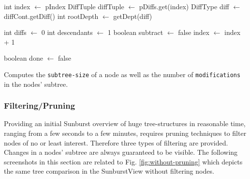 \begin{algorithm}[tb]
{}
\BlankLine
int index $\leftarrow$ pIndex\;
DiffTuple diffTuple $\leftarrow$ pDiffs.get(index)\;
DiffType diff $\leftarrow$ diffCont.getDiff()\;
int rootDepth $\leftarrow$ getDept(diff)\;

int diffs $\leftarrow$ 0\;
int descendants $\leftarrow$ 1\;
boolean subtract $\leftarrow$ false\;
index $\leftarrow$ index + 1\;


boolean done $\leftarrow$ false\;
\caption{Computes the \texttt{subtree-size} of a node as well as the number of \texttt{modifications} in the nodes' subtree.}\label{algo:descModCount}
\end{algorithm}

\subsubsection{Filtering/Pruning}
Providing an initial Sunburst overview of huge tree-struc\-tures in reasonable time, ranging from a few seconds to a few minutes, requires pruning techniques to filter nodes of no or least interest. Therefore three types of filtering are provided. Changes in a nodes' subtree are always guaranteed to be visible. The following screenshots in this section are related to Fig. \ref{fig:without-pruning} which depicts the same tree comparison in the SunburstView without filtering nodes.

